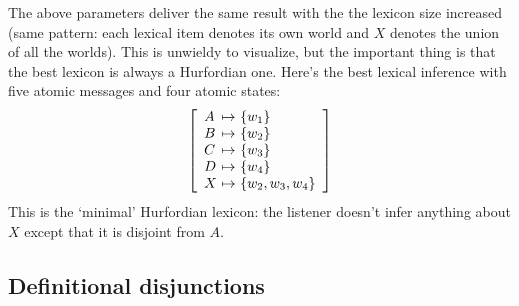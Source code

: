 \documentclass{article}
\begin{document}
\begin{examples}
\item The above parameters deliver the same result with the the
  lexicon size increased (same pattern: each lexical item denotes its
  own world and $X$ denotes the union of all the worlds). This is
  unwieldy to visualize, but the important thing is that the best
  lexicon is always a Hurfordian one. Here's the best lexical
  inference with five atomic messages and four atomic states:
  \[
  \left[
    \begin{array}[c]{l@{ \ \mapsto \ }l}
      A & \set{w_{1}} \\
      B & \set{w_{2}} \\
      C & \set{w_{3}} \\
      D & \set{w_{4}} \\
      X & \set{w_{2}, w_{3}, w_{4}}
    \end{array}
  \right]
  \]
  This is the `minimal' Hurfordian lexicon: the listener doesn't infer
  anything about $X$ except that it is disjoint from $A$.    
\end{examples}


\subsection{Definitional disjunctions}\label{sec:analysis:definitional}
\end{document}
